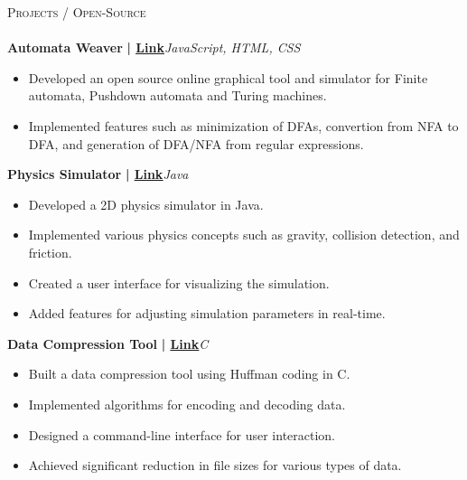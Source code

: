 \documentclass[a4paper]{article}
\newcommand{\lineunder} {
    \vspace*{-8pt} \\
    \hspace*{-18pt} \hrulefill \\
}
\newcommand{\header} [1] {
    {\hspace*{-18pt}\vspace*{6pt} \textsc{#1}}
    \vspace*{-6pt} \lineunder
}
\begin{document}
      \header{Projects / Open-Source}
      \vspace{2mm}
      {\textbf{Automata Weaver}}\textbf{ | \href{https://github.com/syedhuzaif199/automata-weaver}{\underline{Link}}}\hfill{\sl JavaScript, HTML, CSS}\\
          \vspace{-1mm}
\begin{itemize} \itemsep -3pt
\item  Developed an open source online graphical tool and simulator for Finite automata, Pushdown automata and Turing machines.
\item  Implemented features such as minimization of DFAs, convertion from NFA to DFA, and generation of DFA/NFA from regular expressions.
\end{itemize}
          \vspace*{3mm}
      {\textbf{Physics Simulator}}\textbf{ | \href{https://github.com/syedhuzaif199/physics-simulator}{\underline{Link}}}\hfill{\sl Java}\\
          \vspace{-1mm}
\begin{itemize} \itemsep -3pt
\item Developed a 2D physics simulator in Java.
\item Implemented various physics concepts such as gravity, collision detection, and friction.
\item Created a user interface for visualizing the simulation.
\item Added features for adjusting simulation parameters in real-time.
\end{itemize}
          \vspace*{3mm}
      {\textbf{Data Compression Tool}}\textbf{ | \href{https://github.com/syedhuzaif199/data-compression-tool}{\underline{Link}}}\hfill{\sl C}\\
          \vspace{-1mm}
\begin{itemize} \itemsep -3pt
\item Built a data compression tool using Huffman coding in C.
\item Implemented algorithms for encoding and decoding data.
\item Designed a command-line interface for user interaction.
\item Achieved significant reduction in file sizes for various types of data.
\end{itemize}
\end{document}
